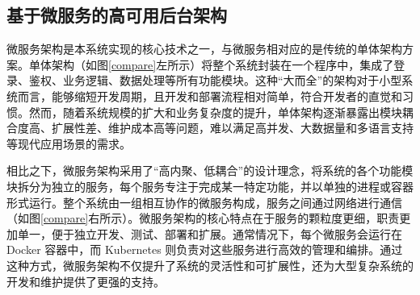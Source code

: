 \documentclass[UTF8,a4paper,12pt]{ctexart}
\numberwithin{equation}{section}
\begin{document}
\subsection{基于微服务的高可用后台架构}
微服务架构是本系统实现的核心技术之一，与微服务相对应的是传统的单体架构方案。单体架构（如图\ref{compare}左所示）将整个系统封装在一个程序中，集成了登录、鉴权、业务逻辑、数据处理等所有功能模块。这种“大而全”的架构对于小型系统而言，能够缩短开发周期，且开发和部署流程相对简单，符合开发者的直觉和习惯。然而，随着系统规模的扩大和业务复杂度的提升，单体架构逐渐暴露出模块耦合度高、扩展性差、维护成本高等问题，难以满足高并发、大数据量和多语言支持等现代应用场景的需求。\par
相比之下，微服务架构采用了“高内聚、低耦合”的设计理念，将系统的各个功能模块拆分为独立的服务，每个服务专注于完成某一特定功能，并以单独的进程或容器形式运行。整个系统由一组相互协作的微服务构成，服务之间通过网络进行通信（如图\ref{compare}右所示）。微服务架构的核心特点在于服务的颗粒度更细，职责更加单一，便于独立开发、测试、部署和扩展。通常情况下，每个微服务会运行在 Docker 容器中，而 Kubernetes 则负责对这些服务进行高效的管理和编排。通过这种方式，微服务架构不仅提升了系统的灵活性和可扩展性，还为大型复杂系统的开发和维护提供了更强的支持。\par
\end{document}
